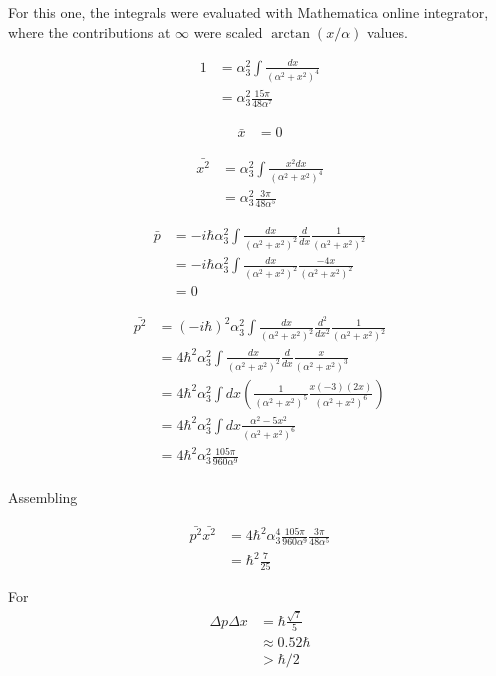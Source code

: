 \documentclass{article}
\begin{document}
For this one, the integrals were evaluated with Mathematica online integrator, where the contributions at $\infty$ were scaled $\arctan(x/\alpha)$ values.

\begin{align*}
1 
&= \alpha_3^2 \int \frac{dx}{(\alpha^2 + x^2)^4} \\
&= \alpha_3^2 \frac{15 \pi}{48 \alpha^7}
\end{align*}

\begin{align*}
\bar{x} &= 0
\end{align*}

\begin{align*}
\bar{x^2} 
&= \alpha_3^2 \int \frac{x^2 dx}{(\alpha^2 + x^2)^4} \\
&= \alpha_3^2 \frac{3 \pi}{48 \alpha^5}
\end{align*}

\begin{align*}
\bar{p} 
&= -i \hbar \alpha_3^2 \int \frac{dx}{(\alpha^2 + x^2)^2} \frac{d}{dx} \frac{1}{(\alpha^2 + x^2)^2}  \\
&= -i \hbar \alpha_3^2 \int \frac{dx}{(\alpha^2 + x^2)^2} \frac{-4x}{(\alpha^2 + x^2)^2} \\
&= 0
\end{align*}

\begin{align*}
\bar{p^2} 
&= (-i \hbar)^2 \alpha_3^2 \int \frac{dx}{(\alpha^2 + x^2)^2} \frac{d^2}{dx^2} \frac{1}{(\alpha^2 + x^2)^2}  \\
&= 4 \hbar^2 \alpha_3^2 \int \frac{dx}{(\alpha^2 + x^2)^2} \frac{d}{dx} \frac{x}{(\alpha^2 + x^2)^3} \\
&= 4 \hbar^2 \alpha_3^2 \int dx
\left( \frac{1}{(\alpha^2 + x^2)^5} \frac{x(-3)(2x)}{(\alpha^2 + x^2)^6} \right)
\\
&= 4 \hbar^2 \alpha_3^2 \int dx \frac{\alpha^2 - 5x^2}{(\alpha^2 + x^2)^6} 
\\
&= 4 \hbar^2 \alpha_3^2 \frac{105 \pi}{960 \alpha^9}
\\
\end{align*}

Assembling

\begin{align*}
\bar{p^2} \bar{x^2} 
&= 4 \hbar^2 \alpha_3^4 \frac{105 \pi}{960 \alpha^9} \frac{3 \pi}{48 \alpha^5} \\
&= \hbar^2 \frac{7}{25}
\end{align*}

For
\begin{align*}
\Delta{p} \Delta{x} 
&= \hbar \frac{\sqrt{7}}{5} \\
&\approx 0.52 \hbar  \\
&> \hbar/2
\end{align*}



\end{document}
